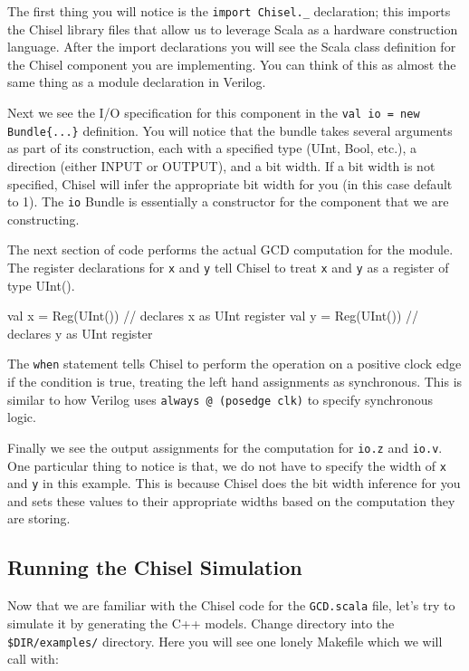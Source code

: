 \documentclass[twocolumn, 10pt]{article}
\begin{document}
The first thing you will notice is the \verb+import Chisel._+ declaration; this imports the Chisel library files that allow us to leverage Scala as a hardware construction language. After the import declarations you will see the Scala class definition for the Chisel component you are implementing. You can think of this as almost the same thing as a module declaration in Verilog.

Next we see the I/O specification for this component in the \verb+val io = new Bundle{...}+ definition. You will notice that the bundle takes several arguments as part of its construction, each with a specified type (UInt, Bool, etc.), a direction (either INPUT or OUTPUT), and a bit width. If a bit width is not specified, Chisel will infer the appropriate bit width for you (in this case default to 1). The \verb+io+ Bundle is essentially a constructor for the component that we are constructing.

The next section of code performs the actual GCD computation for the module. The register declarations for \verb+x+ and \verb+y+ tell Chisel to treat \verb+x+ and \verb+y+ as a register of type UInt(). 

\begin{scala}
val x = Reg(UInt()) // declares x as UInt register
val y = Reg(UInt()) // declares y as UInt register
\end{scala}

The \verb+when+ statement tells Chisel to perform the operation on a positive clock edge if the condition is true, treating the left hand assignments as synchronous. This is similar to how Verilog uses \verb+always @ (posedge clk)+ to specify synchronous logic.

Finally we see the output assignments for the computation for \verb+io.z+ and \verb+io.v+. One particular thing to notice is that, we do not have to specify the width of \verb+x+ and \verb+y+ in this example. This is because Chisel does the bit width inference for you and sets these values to their appropriate widths based on the computation they are storing.

\subsection{Running the Chisel Simulation}

Now that we are familiar with the Chisel code for the \verb+GCD.scala+ file, let's try to simulate it by generating the C++ models. Change directory into the \verb+$DIR/examples/+ directory. Here you will see one lonely Makefile which we will call with:
\end{document}
